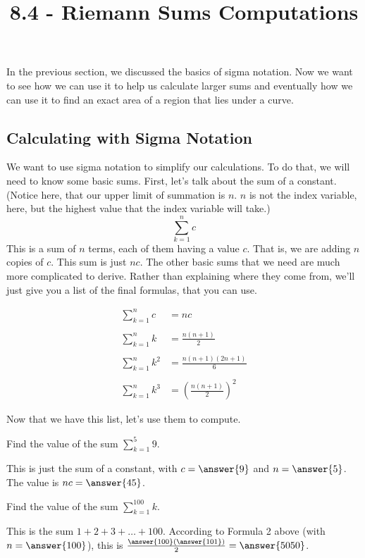 \documentclass{ximera}
\title{8.4 - Riemann Sums Computations}
\begin{document}
\maketitle
In the previous section, we discussed the basics of sigma notation. Now we want to see how we can use it to help us calculate larger sums and eventually how we can use it to find an exact area of a region that lies under a curve.

\subsection{Calculating with Sigma Notation}
 We want to use sigma notation to simplify our calculations.  To do that, we will need to know some basic sums.  
 First, let's talk about the sum of a constant.  (Notice here, that our upper limit of summation is $n$.  $n$ is not the index 
 variable, here, but the highest value that the index variable will take.)
 \[ \sum_{k=1}^n c \] 
 This is a sum of $n$ terms, each of them having a value $c$.  That is, we are adding $n$ copies of $c$.  This sum is just $nc$.
 The other basic sums that we need are much more complicated to derive.  Rather than explaining where they come from, we'll just give you
 a list of the final formulas, that you can use.
 
 \begin{align*}
	\sum_{k=1}^n c &= nc \\ \\
	\sum_{k=1}^n k &= \frac{n(n+1)}{2} \\ \\
	\sum_{k=1}^n k^2 &= \frac{n(n+1)(2n+1)}{6} \\ \\
	\sum_{k=1}^n k^3 &= \left(\frac{n(n+1)}{2}\right)^2
\end{align*} 


Now that we have this list, let's use them to compute.
\begin{example}
	Find the value of the sum $\displaystyle \sum_{k=1}^{5} 9$.
	\begin{explanation}
		This is just the sum of a constant, with $c=\answer{9}$ and $n=\answer{5}$.  The value is $nc=\answer{45}$.	
	\end{explanation}
\end{example}

 

\begin{example}
	Find the value of the sum $\displaystyle \sum_{k=1}^{100} k$.
	\begin{explanation}
		This is the sum $1+2+3+ \ldots + 100$.  According to Formula 2 above (with $n=\answer{100}$), this is $\frac{\answer{100}(\answer{101})}{2} = \answer{5050}$.	
	\end{explanation}
\end{example}
\end{document}
